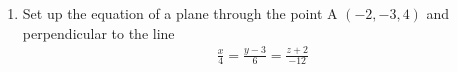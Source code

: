 \renewcommand{\theequation}{\theenumi}
\renewcommand{\thefigure}{\theenumi}
\begin{enumerate}[label=\thesubsection.\arabic*.,ref=\thesubsection.\theenumi]
%
\item 
\begin{enumerate}
Set up the equation of a plane through the point A $\left(-2, -3, 4 \right)$ and perpendicular to the line 
\begin{align}
\frac{x}{4} = \frac{y - 3}{6} = \frac{z+2}{-12} \label{eq:solutions/4/48/6/b/eq1.1}
\end{align}
%
\solution


\end{enumerate}
\end{enumerate}


